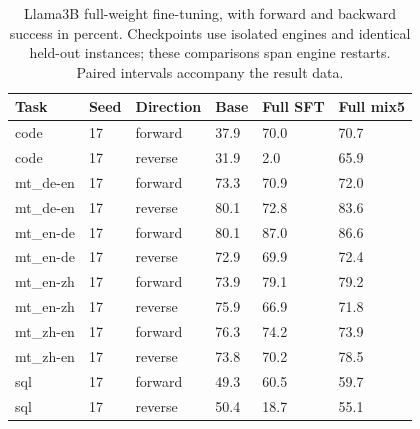 \begin{table}[t]
\centering\small
\begin{tabular}{llllll}
\toprule
Task & Seed & Direction & Base & Full SFT & Full mix5 \\
\midrule
code & 17 & forward & 37.9 & 70.0 & 70.7 \\
code & 17 & reverse & 31.9 & 2.0 & 65.9 \\
mt\_de-en & 17 & forward & 73.3 & 70.9 & 72.0 \\
mt\_de-en & 17 & reverse & 80.1 & 72.8 & 83.6 \\
mt\_en-de & 17 & forward & 80.1 & 87.0 & 86.6 \\
mt\_en-de & 17 & reverse & 72.9 & 69.9 & 72.4 \\
mt\_en-zh & 17 & forward & 73.9 & 79.1 & 79.2 \\
mt\_en-zh & 17 & reverse & 75.9 & 66.9 & 71.8 \\
mt\_zh-en & 17 & forward & 76.3 & 74.2 & 73.9 \\
mt\_zh-en & 17 & reverse & 73.8 & 70.2 & 78.5 \\
sql & 17 & forward & 49.3 & 60.5 & 59.7 \\
sql & 17 & reverse & 50.4 & 18.7 & 55.1 \\
\bottomrule
\end{tabular}
\caption{Llama3B full-weight fine-tuning, with forward and backward success in percent. Checkpoints use isolated engines and identical held-out instances; these comparisons span engine restarts. Paired intervals accompany the result data.}
\label{tab:fullft-snapshot}
\end{table}
